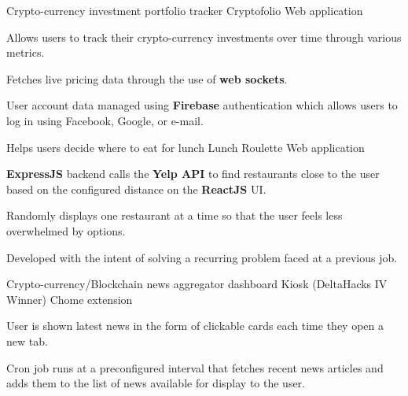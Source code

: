 


\begin{cventries}


\cventry
{Crypto-currency investment portfolio tracker} %
{Cryptofolio \href{https://github.com/kdelalic/Cryptofolio}{\faGithub}} %
{Web application}
{}
{ %
\begin{cvitems}
\item {Allows users to track their crypto-currency investments over time through various metrics.}
\item {Fetches live pricing data through the use of \textbf{web sockets}.}
\item {User account data managed using \textbf{Firebase} authentication which allows users to log in using Facebook, Google, or e-mail.}
\end{cvitems}
}


\cventry
{Helps users decide where to eat for lunch} %
{Lunch Roulette \href{https://github.com/kdelalic/lunch-roulette}{\faGithub}} %
{Web application}
{}
{ %
\begin{cvitems}
\item {\textbf{ExpressJS} backend calls the \textbf{Yelp API} to find restaurants close to the user based on the configured distance on the \textbf{ReactJS} UI.}
\item {Randomly displays one restaurant at a time so that the user feels less overwhelmed by options.}
\item {Developed with the intent of solving a recurring problem faced at a previous job.}
\end{cvitems}
}


\cventry
{Crypto-currency/Blockchain news aggregator dashboard} %
{Kiosk (DeltaHacks IV Winner)  \href{https://github.com/kdelalic/kiosk}{\faGithub}} %
{Chome extension}
{}
{ %
\begin{cvitems}
\item {User is shown latest news in the form of clickable cards each time they open a new tab.}
\item {Cron job runs at a preconfigured interval that fetches recent news articles and adds them to the list of news available for display to the user.}
\end{cvitems}
}


\end{cventries}
